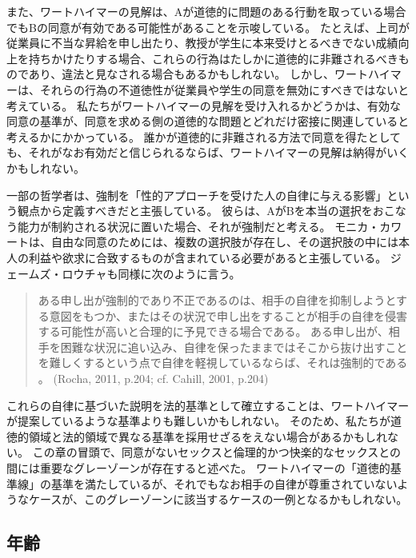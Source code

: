 \documentclass[paper=a4,book,openany]{jlreq}
\newcommand{\ig}[1]{}           %
\begin{document}
また、ワートハイマーの見解は、Aが道徳的に問題のある行動を取っている場合でもBの同意が有効である可能性があることを示唆している。
たとえば、上司が従業員に不当な昇給を申し出たり、教授が学生に本来受けとるべきでない成績向上を持ちかけたりする場合、これらの行為はたしかに道徳的に非難されるべきものであり、違法と見なされる場合もあるかもしれない。
しかし、ワートハイマーは、それらの行為の不道徳性が従業員や学生の同意を無効にすべきではないと考えている。
私たちがワートハイマーの見解を受け入れるかどうかは、有効な同意の基準が、同意を求める側の道徳的な問題とどれだけ密接に関連していると考えるかにかかっている。
誰かが道徳的に非難される方法で同意を得たとしても、それがなお有効だと信じられるならば、ワートハイマーの見解は納得がいくかもしれない。

一部の哲学者は、強制を「性的アプローチを受けた人の自律に与える影響」という観点から定義すべきだと主張している。
彼らは、AがBを本当の選択をおこなう能力が制約される状況に置いた場合、それが強制だと考える。
モニカ・カワート\ig{Monica Cowart}は、自由な同意のためには、複数の選択肢が存在し、その選択肢の中には本人の利益や欲求に合致するものが含まれている必要があると主張している\citep{cowart04:_under_acts_consen}。
ジェームズ・ロウチャも同様に次のように言う。

\begin{quote}
ある申し出が強制的であり不正であるのは、相手の自律を抑制しようとする意図をもつか、またはその状況で申し出をすることが相手の自律を侵害する可能性が高いと合理的に予見できる場合である。
ある申し出が、相手を困難な状況に追い込み、自律を保ったままではそこから抜け出すことを難しくするという点で自律を軽視しているならば、それは強制的である  \nocite{rocha11:_sexual_haras_coerc_offer} \nocite{cahill01:_rethin_rape}。
(Rocha, 2011, p.204; cf. Cahill, 2001, p.204)

\end{quote}

これらの自律に基づいた説明を法的基準として確立することは、ワートハイマーが提案しているような基準よりも難しいかもしれない。
そのため、私たちが道徳的領域と法的領域で異なる基準を採用せざるをえない場合があるかもしれない。
この章の冒頭で、同意がないセックスと倫理的かつ快楽的なセックスとの間には重要なグレーゾーンが存在すると述べた。
ワートハイマーの「道徳的基準線」の基準を満たしているが、それでもなお相手の自律が尊重されていないようなケースが、このグレーゾーンに該当するケースの一例となるかもしれない。

\subsection{年齢}
\end{document}
